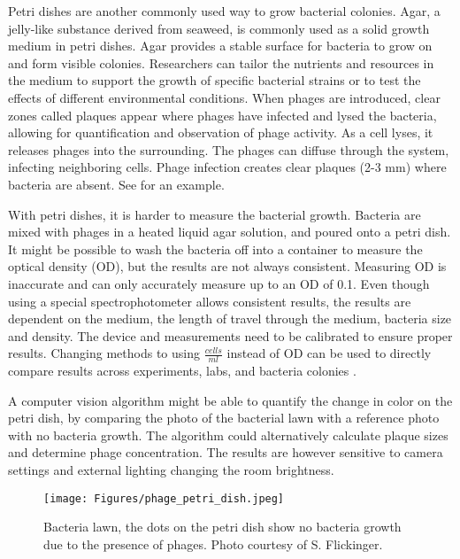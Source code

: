 Petri dishes are another commonly used way to grow bacterial colonies. 
Agar, a jelly-like substance derived from seaweed, is commonly used as a solid growth medium in petri dishes. 
Agar provides a stable surface for bacteria to grow on and form visible colonies. 
Researchers can tailor the nutrients and resources in the medium to support the growth of specific bacterial strains or to test the effects of different environmental conditions. 
When phages are introduced, clear zones called plaques appear where phages have infected and lysed the bacteria, allowing for quantification and observation of phage activity. 
As a cell lyses, it releases phages into the surrounding. 
The phages can diffuse through the system, infecting neighboring cells. 
Phage infection creates clear plaques (2-3 mm) where bacteria are absent. 
See  for an example.

With petri dishes, it is harder to measure the bacterial growth. 
Bacteria are mixed with phages in a heated liquid agar solution, and poured onto a petri dish. 
It might be possible to wash the bacteria off into a container to measure the optical density (OD), but the results are not always consistent. 
Measuring OD is inaccurate and can only accurately measure up to an OD of 0.1. Even though using a special spectrophotometer allows consistent results, the results are dependent on the medium, the length of travel through the medium, bacteria size and density. 
The device and measurements need to be calibrated to ensure proper results. 
Changing methods to using $\frac{\textit{cells}}{\textit{ml}}$ instead of OD can be used to directly compare results across experiments, labs, and bacteria colonies \cite{miraEstimatingMicrobialPopulation2022}. 

A computer vision algorithm might be able to quantify the change in color on the petri dish, by comparing the photo of the bacterial lawn with a reference photo with no bacteria growth. 
The algorithm could alternatively calculate plaque sizes and determine phage concentration. 
The results are however sensitive to camera settings and external lighting changing the room brightness.  

\begin{figure}[h!]
    \texttt{[image: Figures/phage\_petri\_dish.jpeg]}
    \centering
    \caption{
        Bacteria lawn, the dots on the petri dish show no bacteria growth due to the presence of phages. 
        Photo courtesy of S. Flickinger. 
    }
    \label{fig:phage_petri_dish}
\end{figure}

